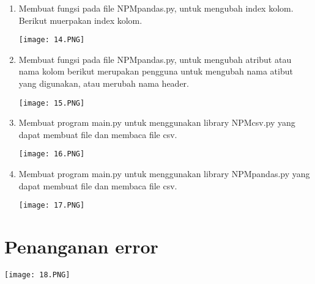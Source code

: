 \documentclass{article}
\begin{document}
\begin{enumerate}
    \item Membuat fungsi pada ﬁle NPMpandas.py, untuk mengubah index kolom. Berikut muerpakan index kolom.\\
    \begin{center}
    \texttt{[image: 14.PNG]}
    \end{center}
    
    \item Membuat fungsi pada ﬁle NPMpandas.py, untuk mengubah atribut atau nama kolom berikut merupakan pengguna untuk mengubah nama atibut yang digunakan, atau merubah nama header.\\
    \begin{center}
    \texttt{[image: 15.PNG]}
    \end{center}
    
    \item Membuat program main.py untuk menggunakan library NPMcsv.py yang dapat membuat ﬁle dan membaca ﬁle csv.\\
    \begin{center}
    \texttt{[image: 16.PNG]}
    \end{center}
    
    \item Membuat program main.py untuk menggunakan library NPMpandas.py yang dapat membuat ﬁle dan membaca ﬁle csv.\\
    \begin{center}
    \texttt{[image: 17.PNG]}
    \end{center}
\end{enumerate}
\section{Penanganan error}
    \begin{center}
    \texttt{[image: 18.PNG]}
    \end{center}
\end{document}
